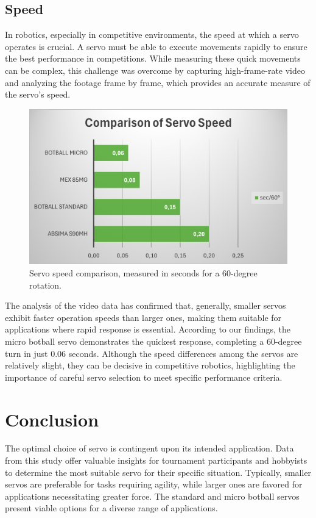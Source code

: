 \documentclass[conference]{IEEEtran}
\begin{document}
\subsection{Speed}
In robotics, especially in competitive environments, the speed at which a servo operates is crucial. A servo must be able to execute movements rapidly to ensure the best performance in competitions. While measuring these quick movements can be complex, this challenge was overcome by capturing high-frame-rate video and analyzing the footage frame by frame, which provides an accurate measure of the servo's speed.

\begin{figure}[hbpt]
\centering
\includegraphics[width=\linewidth]{speed_comparison_chart.png}
\caption{Servo speed comparison, measured in seconds for a 60-degree rotation.}
\label{fig:speed_comparison}
\end{figure}

The analysis of the video data has confirmed that, generally, smaller servos exhibit faster operation speeds than larger ones, making them suitable for applications where rapid response is essential. According to our findings, the micro botball servo demonstrates the quickest response, completing a 60-degree turn in just 0.06 seconds. Although the speed differences among the servos are relatively slight, they can be decisive in competitive robotics, highlighting the importance of careful servo selection to meet specific performance criteria.

\section{Conclusion}
The optimal choice of servo is contingent upon its intended application. Data from this study offer valuable insights for tournament participants and hobbyists to determine the most suitable servo for their specific situation. Typically, smaller servos are preferable for tasks requiring agility, while larger ones are favored for applications necessitating greater force. The standard and micro botball servos present viable options for a diverse range of applications.
\end{document}
